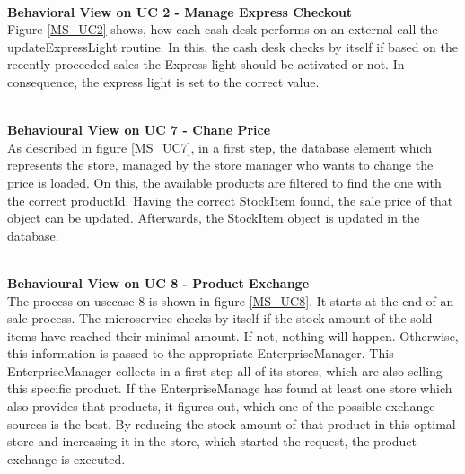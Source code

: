 		\noindent
		\\
		\textbf{Behavioral View on UC 2 - Manage Express Checkout} \\
		Figure \ref{MS_UC2} shows, how each cash desk performs on an external call the updateExpressLight routine. In this, the cash desk checks by itself if based on the recently proceeded sales the Express light should be activated or not. In consequence, the express light is set to the correct value. 
		
		\noindent
		\\
		\textbf{Behavioural View on UC 7 - Chane Price} \\
		As described in figure \ref{MS_UC7}, in a first step, the database element which represents the store, managed by the store manager who wants to change the price is loaded. On this, the available products are filtered to find the one with the correct productId. 
		Having the correct StockItem found, the sale price of that object can be updated. Afterwards, the StockItem object is updated in the database.
		
		\noindent
		\\
		\textbf{Behavioural View on UC 8 - Product Exchange} \\
		The process on usecase 8 is shown in figure \ref{MS_UC8}. It starts at the end of an sale process. The microservice checks by itself if the stock amount of the sold items have reached their minimal amount. If not, nothing will happen. Otherwise, this information is passed to the appropriate EnterpriseManager. 
		This EnterpriseManager collects in a first step all of its stores, which are also selling this specific product.
		If the EnterpriseManage has found at least one store which also provides that products, it figures out, which one of the possible exchange sources is the best. By reducing the stock amount of that product in this optimal store and increasing it in the store, which started the request, the product exchange is executed.
		
